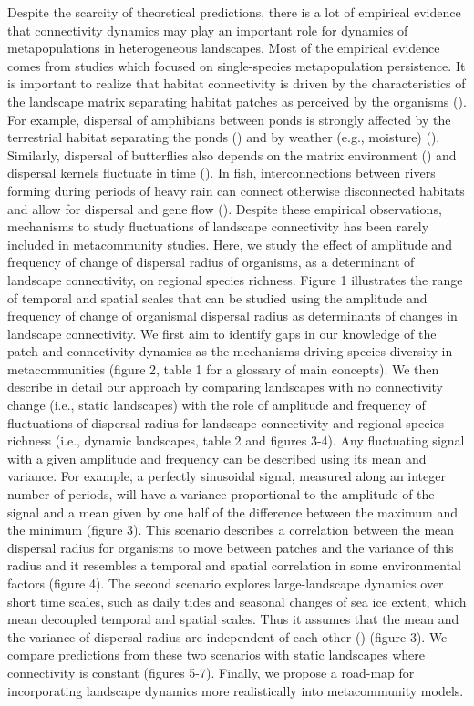 \documentclass[12pt]{article}
\begin{document}
Despite the scarcity of theoretical predictions, there is a lot of empirical evidence that connectivity dynamics may play an important role for dynamics of metapopulations in heterogeneous landscapes. Most of the empirical evidence comes from studies which focused on single-species metapopulation persistence. It is important to realize that habitat connectivity is driven by the characteristics of the landscape matrix separating habitat patches as perceived by the organisms (\cite{EycottEtAl2012}). For example, dispersal of amphibians between ponds is strongly affected by the terrestrial habitat separating the ponds (\cite{VanBuskirk2012, ClineHunter2014}) and by weather (e.g., moisture) (\cite{RittenhouseEtAl2009}). Similarly, dispersal of butterflies also depends on the matrix environment (\cite{KueflerEtAl2010}) and dispersal kernels fluctuate in time (\cite{SchtickzelleEtAl2012}). In fish, interconnections between rivers forming during periods of heavy rain can connect otherwise disconnected habitats and allow for dispersal and gene flow (\cite{BoizardEtAl2009}). Despite these empirical observations, mechanisms to study fluctuations of landscape connectivity has been rarely included in metacommunity studies. Here, we study the effect of amplitude and frequency of change of dispersal radius of organisms, as a determinant of landscape connectivity, on regional species richness. Figure 1 illustrates the range of temporal and spatial scales that can be studied using the amplitude and frequency of change of organismal dispersal radius as determinants of changes in landscape connectivity. We first aim to identify gaps in our knowledge of the patch and connectivity dynamics as the mechanisms driving species diversity in metacommunities (figure 2, table 1 for a glossary of main concepts). We then describe in detail our approach by comparing landscapes with no connectivity change (i.e., static landscapes) with the role of amplitude and frequency of fluctuations of dispersal radius for landscape connectivity and regional species richness (i.e., dynamic landscapes, table 2 and figures 3-4). Any fluctuating signal with a given amplitude and frequency can be described using its mean and variance. For example, a perfectly sinusoidal signal, measured along an integer number of periods, will have a variance proportional to the amplitude of the signal and a mean given by one half of the difference between the maximum and the minimum (figure 3). This scenario describes a correlation between the mean dispersal radius for organisms to move between patches and the variance of this radius and it resembles a temporal and spatial correlation in some environmental factors (figure 4). The second scenario explores large-landscape dynamics over short time scales, such as daily tides and seasonal changes of sea ice extent, which mean decoupled temporal and spatial scales. Thus it assumes that the mean and the variance of dispersal radius are independent of each other (\cite{Violletal2012}) (figure 3). We compare predictions from these two scenarios with static landscapes where connectivity is constant (figures 5-7). Finally, we propose a road-map for incorporating landscape dynamics more realistically into metacommunity models.
\end{document}
